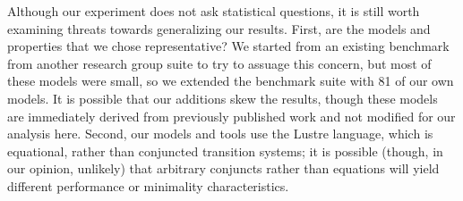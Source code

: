 
Although our experiment does not ask statistical questions, it is still worth examining threats towards generalizing our results.  First, are the models and properties that we chose representative?  We started from an existing benchmark from another research group suite to try to assuage this concern, but most of these models were small, so we extended the benchmark suite with 81 of our own models.  It is possible that our additions skew the results, though these models are immediately derived from previously published work and not modified for our analysis here.  Second, our models and tools use the Lustre language, which is equational, rather than conjuncted transition systems; it is possible (though, in our opinion, unlikely) that arbitrary conjuncts rather than equations will yield different performance or minimality characteristics.



